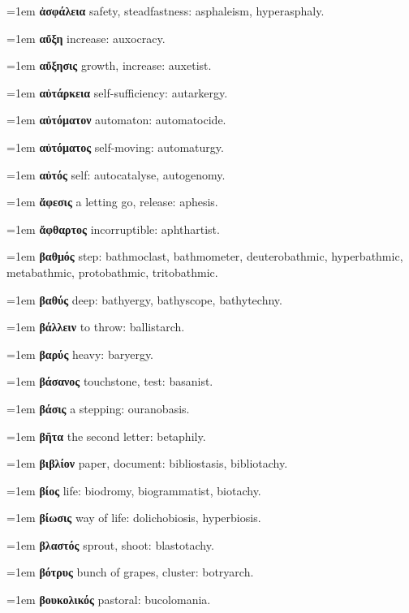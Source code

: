 \hangindent=1em \textbf{ἀσφάλεια} safety, steadfastness: asphaleism, hyperasphaly.\par
\hangindent=1em \textbf{αὔξη} increase: auxocracy.\par
\hangindent=1em \textbf{αὔξησις} growth, increase: auxetist.\par
\hangindent=1em \textbf{αὐτάρκεια} self-sufficiency: autarkergy.\par
\hangindent=1em \textbf{αὐτόματον} automaton: automatocide.\par
\hangindent=1em \textbf{αὐτόματος} self-moving: automaturgy.\par
\hangindent=1em \textbf{αὐτός} self: autocatalyse, autogenomy.\par
\hangindent=1em \textbf{ἄφεσις} a letting go, release: aphesis.\par
\hangindent=1em \textbf{ἄφθαρτος} incorruptible: aphthartist.\par
\hangindent=1em \textbf{βαθμός} step: bathmoclast, bathmometer, deuterobathmic, hyperbathmic, metabathmic, protobathmic, tritobathmic.\par
\hangindent=1em \textbf{βαθύς} deep: bathyergy, bathyscope, bathytechny.\par
\hangindent=1em \textbf{βάλλειν} to throw: ballistarch.\par
\hangindent=1em \textbf{βαρύς} heavy: baryergy.\par
\hangindent=1em \textbf{βάσανος} touchstone, test: basanist.\par
\hangindent=1em \textbf{βάσις} a stepping: ouranobasis.\par
\hangindent=1em \textbf{βῆτα} the second letter: betaphily.\par
\hangindent=1em \textbf{βιβλίον} paper, document: bibliostasis, bibliotachy.\par
\hangindent=1em \textbf{βίος} life: biodromy, biogrammatist, biotachy.\par
\hangindent=1em \textbf{βίωσις} way of life: dolichobiosis, hyperbiosis.\par
\hangindent=1em \textbf{βλαστός} sprout, shoot: blastotachy.\par
\hangindent=1em \textbf{βότρυς} bunch of grapes, cluster: botryarch.\par
\hangindent=1em \textbf{βουκολικός} pastoral: bucolomania.\par
